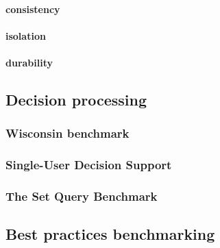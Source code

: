 \paragraph{consistency}
\paragraph{isolation}
\paragraph{durability}

\subsection{Decision processing}
\subsubsection{Wisconsin benchmark}

\subsubsection{Single-User Decision Support} %

\subsubsection{The Set Query Benchmark}

\subsection{Best practices benchmarking}
